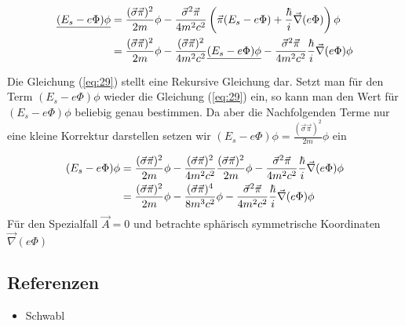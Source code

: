 \begin{align}
  \label{eq:29}
  \underline{(E_s-e\Phi)\phi} &= \frac{(\vec\sigma\vec\pi)^2 }{2m}\phi - \frac{\vec\sigma^2\vec\pi }{4m^2c^2}\left(\vec\pi(E_s-e\Phi) + \frac{\hbar}{i}\vec\nabla(e\Phi)\right)  \phi \notag\\
&= \frac{(\vec\sigma\vec\pi)^2 }{2m}\phi - \frac{(\vec\sigma\vec\pi)^2 }{4m^2c^2}\underline{(E_s-e\Phi)\phi}- \frac{\vec\sigma^2\vec\pi }{4m^2c^2}\frac{\hbar}{i}\vec\nabla(e\Phi) \phi 
\end{align}

Die Gleichung (\ref{eq:29}) stellt eine Rekursive Gleichung dar. Setzt man für den Term \((E_s-e\Phi)\phi\) wieder die Gleichung (\ref{eq:29}) ein, so kann man den Wert für \((E_s-e\Phi)\phi\) beliebig genau bestimmen. Da aber die Nachfolgenden Terme nur eine kleine Korrektur darstellen setzen wir \((E_s-e\Phi)\phi = \frac{(\vec\sigma\vec\pi)^2 }{2m}\phi \) ein

\begin{align}
  \label{eq:30}
  (E_s-e\Phi)\phi &= \frac{(\vec\sigma\vec\pi)^2 }{2m}\phi - \frac{(\vec\sigma\vec\pi)^2 }{4m^2c^2} \frac{(\vec\sigma\vec\pi)^2 }{2m}\phi - \frac{\vec\sigma^2\vec\pi }{4m^2c^2}\frac{\hbar}{i}\vec\nabla(e\Phi) \phi  \notag\\
&= \frac{(\vec\sigma\vec\pi)^2 }{2m}\phi - \frac{(\vec\sigma\vec\pi)^4 }{8m^3c^2}\phi - \frac{\vec\sigma^2\vec\pi }{4m^2c^2}\frac{\hbar}{i}\vec\nabla(e\Phi) \phi  \notag\\
\end{align}
Für den Spezialfall \(\vec A = 0\) und betrachte sphärisch symmetrische Koordinaten \( \vec\nabla(e\Phi)\)


\subsection*{Referenzen}
\begin{itemize}
\item Schwabl
\end{itemize}


